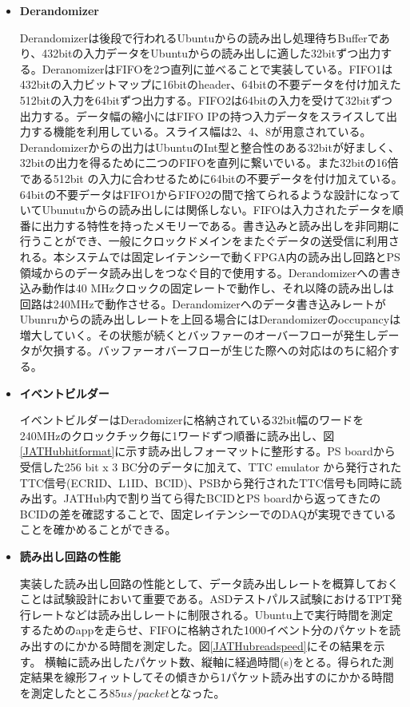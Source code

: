 \begin{itemize}
    \item \textbf{Derandomizer} \par
    Derandomizerは後段で行われるUbuntuからの読み出し処理待ちBufferであり、432bitの入力データをUbuntuからの読み出しに適した32bitずつ出力する。DeranomizerはFIFOを2つ直列に並べることで実装している。FIFO1は432bitの入力ビットマップに16bitのheader、64bitの不要データを付け加えた512bitの入力を64bitずつ出力する。FIFO2は64bitの入力を受けて32bitずつ出力する。データ幅の縮小にはFIFO IPの持つ入力データをスライスして出力する機能を利用している。スライス幅は2、4、8が用意されている。Derandomizerからの出力はUbuntuのInt型と整合性のある32bitが好ましく、32bitの出力を得るために二つのFIFOを直列に繋いでいる。また32bitの16倍である512bit の入力に合わせるために64bitの不要データを付け加えている。64bitの不要データはFIFO1からFIFO2の間で捨てられるような設計になっていてUbunutuからの読み出しには関係しない。FIFOは入力されたデータを順番に出力する特性を持ったメモリーである。書き込みと読み出しを非同期に行うことができ、一般にクロックドメインをまたぐデータの送受信に利用される。本システムでは固定レイテンシーで動くFPGA内の読み出し回路とPS領域からのデータ読み出しをつなぐ目的で使用する。Derandomizerへの書き込み動作は40 MHzクロックの固定レートで動作し、それ以降の読み出しは回路は240MHzで動作させる。Derandomizerへのデータ書き込みレートがUbunruからの読み出しレートを上回る場合にはDerandomizerのoccupancyは増大していく。その状態が続くとバッファーのオーバーフローが発生しデータが欠損する。バッファーオバーフローが生じた際への対応はのちに紹介する。
    \baselineskip

    \item \textbf{イベントビルダー} \par
    イベントビルダーはDeradomizerに格納されている32bit幅のワードを240MHzのクロックチック毎に1ワードずつ順番に読み出し、図\ref{JATHubhitformat}に示す読み出しフォーマットに整形する。PS boardから受信した256 bit x 3 BC分のデータに加えて、TTC emulator から発行されたTTC信号(ECRID、L1ID、BCID)、PSBから発行されたTTC信号も同時に読み出す。JATHub内で割り当てら得たBCIDとPS boardから返ってきたのBCIDの差を確認することで、固定レイテンシーでのDAQが実現できていることを確かめることができる。
    \baselineskip

    \item \textbf{読み出し回路の性能} \par
    実装した読み出し回路の性能として、データ読み出しレートを概算しておくことは試験設計において重要である。ASDテストパルス試験におけるTPT発行レートなどは読み出しレートに制限される。Ubuntu上で実行時間を測定するためのappを走らせ、FIFOに格納された1000イベント分のパケットを読み出すのにかかる時間を測定した。図\ref{JATHubreadspeed}にその結果を示す。
    横軸に読み出したパケット数、縦軸に経過時間(s)をとる。得られた測定結果を線形フィットしてその傾きから1パケット読み出すのにかかる時間を測定したところ$85 us/packet$となった。


\end{itemize}
